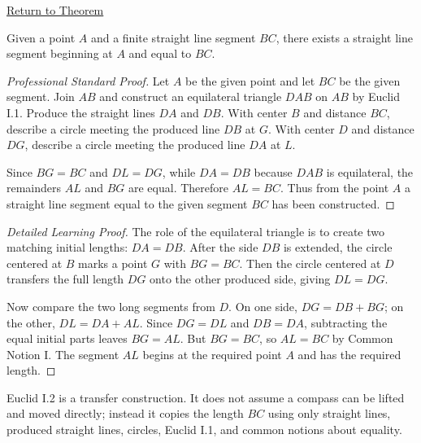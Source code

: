 \newpage
{}
\label{prf:euclid-i-2}

\begin{remark*}[Return]
\hyperref[thm:euclid-i-2]{Return to Theorem}
\end{remark*}

\begin{theorem*}
Given a point $A$ and a finite straight line segment $BC$, there exists a
straight line segment beginning at $A$ and equal to $BC$.
\end{theorem*}

\begin{proof}[Professional Standard Proof]
\LRAProofBodyStart
Let $A$ be the given point and let $BC$ be the given segment. Join $AB$ and
construct an equilateral triangle $DAB$ on $AB$ by Euclid I.1. Produce the
straight lines $DA$ and $DB$. With center $B$ and distance $BC$, describe a
circle meeting the produced line $DB$ at $G$. With center $D$ and distance
$DG$, describe a circle meeting the produced line $DA$ at $L$.

Since $BG=BC$ and $DL=DG$, while $DA=DB$ because $DAB$ is equilateral, the
remainders $AL$ and $BG$ are equal. Therefore $AL=BC$. Thus from the point $A$
a straight line segment equal to the given segment $BC$ has been constructed.
\end{proof}

\begin{proof}[Detailed Learning Proof]
\LRAProofBodyStart


The role of the equilateral triangle is to create two matching initial lengths:
$DA=DB$. After the side $DB$ is extended, the circle centered at $B$ marks a
point $G$ with $BG=BC$. Then the circle centered at $D$ transfers the full
length $DG$ onto the other produced side, giving $DL=DG$.

Now compare the two long segments from $D$. On one side,
$DG=DB+BG$; on the other, $DL=DA+AL$. Since $DG=DL$ and $DB=DA$, subtracting
the equal initial parts leaves $BG=AL$. But $BG=BC$, so $AL=BC$ by Common
Notion I. The segment $AL$ begins at the required point $A$ and has the
required length.
\end{proof}

\begin{remark*}
Euclid I.2 is a transfer construction. It does not assume a compass can be
lifted and moved directly; instead it copies the length $BC$ using only
straight lines, produced straight lines, circles, Euclid I.1, and common
notions about equality.
\end{remark*}

